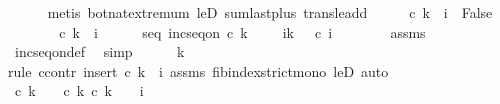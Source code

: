 \begin{isabellebody}
\ \ \ \ \isamarkupfalse%
\ {\isacharparenleft}{\kern0pt}metis\ bot{\isacharunderscore}{\kern0pt}nat{\isacharunderscore}{\kern0pt}{}{\isachardot}{\kern0pt}extremum\ leD\ sum{\isachardot}{\kern0pt}last{\isacharunderscore}{\kern0pt}plus\ trans{\isacharunderscore}{\kern0pt}le{\isacharunderscore}{\kern0pt}add{}{\isacharparenright}{\kern0pt}\isanewline
\ \ \isamarkupfalse%
\ \isamarkupfalse%
\ {\isachardoublequoteopen}c\ k\ {\isacharless}{\kern0pt}\ i\ {\isasymlongrightarrow}\ False{\isachardoublequoteclose}\isanewline
\ \ \isamarkupfalse%
\ \isanewline
\ \ \ \ \isamarkupfalse%
\ {\isachardoublequoteopen}c\ k\ {\isacharless}{\kern0pt}\ i{\isachardoublequoteclose}\isanewline
\ \ \ \ \isamarkupfalse%
\ seq{\isacharcolon}{\kern0pt}\ {\isachardoublequoteopen}inc{\isacharunderscore}{\kern0pt}seq{\isacharunderscore}{\kern0pt}on\ c\ {\isacharbraceleft}{\kern0pt}{}{\isachardot}{\kern0pt}{\isachardot}{\kern0pt}k\ {\isacharminus}{\kern0pt}\ {}\ {\isacharminus}{\kern0pt}\ {}{\isacharbraceright}{\kern0pt}{\isachardoublequoteclose}\ {\isachardoublequoteopen}{\isasymforall}i{\isasymin}{\isacharbraceleft}{\kern0pt}{}{\isachardot}{\kern0pt}{\isachardot}{\kern0pt}k{\isacharminus}{\kern0pt}{}{\isacharbraceright}{\kern0pt}{\isachardot}{\kern0pt}\ {}\ {\isasymle}\ c\ i{\isachardoublequoteclose}\isanewline
\ \ \ \ \ \ \isamarkupfalse%
\ assms\ \isamarkupfalse%
\ inc{\isacharunderscore}{\kern0pt}seq{\isacharunderscore}{\kern0pt}on{\isacharunderscore}{\kern0pt}def\ \isamarkupfalse%
\ simp{\isacharplus}{\kern0pt}\isanewline
\ \ \ \ \isamarkupfalse%
\ {\isachardoublequoteopen}k\ {\isachargreater}{\kern0pt}\ {}{\isachardoublequoteclose}\isanewline
\ \ \ \ \ \ \isamarkupfalse%
{\isacharparenleft}{\kern0pt}rule\ ccontr{\isacharcomma}{\kern0pt}\ insert\ {\isacartoucheopen}c\ k\ {\isacharless}{\kern0pt}\ i{\isacartoucheclose}\ assms\ fib{\isacharunderscore}{\kern0pt}index{\isacharunderscore}{\kern0pt}strict{\isacharunderscore}{\kern0pt}mono\ leD{\isacharcomma}{\kern0pt}\ auto{\isacharparenright}{\kern0pt}\isanewline
\ \ \ \ \isamarkupfalse%
\ {\isachardoublequoteopen}c\ {\isacharparenleft}{\kern0pt}k{\isacharminus}{\kern0pt}{}{\isacharparenright}{\kern0pt}\ {\isacharplus}{\kern0pt}\ {}\ {\isacharless}{\kern0pt}\ c\ k{\isachardoublequoteclose}\ {\isachardoublequoteopen}c\ {\isacharparenleft}{\kern0pt}k{\isacharminus}{\kern0pt}{}{\isacharparenright}{\kern0pt}\ {\isacharplus}{\kern0pt}\ {}\ {\isasymle}\ i{\isachardoublequoteclose}\isanewline

\end{isabellebody}
